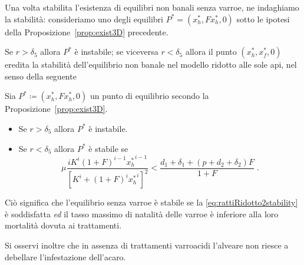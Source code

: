 Una volta stabilita l'esistenza di equilibri non banali senza varroe, ne indaghiamo la stabilità:
consideriamo uno degli equilibri $P^* =(x_h^*, F x_h^*, 0)$ sotto le ipotesi della
Proposizione~\ref{prop:exist3D} precedente.

Se $r > \delta_5$ allora $P^*$ è instabile; se viceversa $r< \delta_5$ allora
il punto $(x_h^*, x_f^*, 0)$ eredita la stabilità dell'equilibrio non banale nel modello
ridotto alle sole api, nel senso della seguente

\begin{proposizione}
    Sia
    $P^* \coloneq (x_h^*, F x_h^*, 0)$ un punto di equilibrio secondo la Proposizione~\ref{prop:exist3D}.
    \begin{itemize}
        \item Se $r > \delta_5 $ allora $P^*$ è instabile.
        \item Se $r < \delta_5 $ allora $P^*$ è stabile se
        \begin{equation}
            \mu \frac{ i K^i (1+F)^{i-1}{x_h^*}^{i-1} }{ {\left[ K^i +(1+F)^i {x_h^*}^i \right]}^2 }
            < \frac{d_1 + \delta_1 + (p+d_2+\delta_2)F}{1+F} \; .
            \label{eq:rattiRidotto2stability}
        \end{equation}
    \end{itemize}
\end{proposizione}

Ciò significa che l'equilibrio senza varroe è stabile se la \eqref{eq:rattiRidotto2stability} è soddisfatta
\emph{ed} il tasso massimo di natalità delle varroe è inferiore alla loro mortalità dovuta ai trattamenti.

Si osservi inoltre che in assenza di trattamenti varroacidi l'alveare non riesce a debellare l'infestazione dell'acaro.


